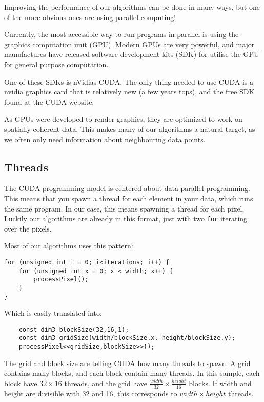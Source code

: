 
Improving the performance of our algorithms can be done in many ways,
but one of the more obvious ones are using parallel computing!

Currently, the most accessible way to run programs in parallel is
using the graphics computation unit (GPU). Modern GPUs are very
powerful, and major manufactures have released software development
kits (SDK) for utilise the GPU for general purpose computation.

One of these SDKs is nVidias CUDA. The only thing needed to
use CUDA is a nvidia graphics card that is relatively new (a few years
tops), and the free SDK found at the CUDA website.

As GPUs were developed to render graphics, they are optimized to work
on spatially coherent data. This makes many of our algorithms a
natural target, as we often only need information about neighbouring
data points.

\subsection{Threads}

The CUDA programming model is centered about data parallel
programming. This means that you spawn a thread for each element in
your data, which runs the same program. In our case, this means
spawning a thread for each pixel. Luckily our algorithms are already
in this format, just with two \texttt{for} iterating over the pixels.

Most of our algorithms uses this pattern:

\begin{lstlisting}
for (unsigned int i = 0; i<iterations; i++) {
    for (unsigned int x = 0; x < width; x++) {
        processPixel();
    }
}
\end{lstlisting}

Which is easily translated into:
\begin{lstlisting}
    const dim3 blockSize(32,16,1);
    const dim3 gridSize(width/blockSize.x, height/blockSize.y);
    processPixel<<gridSize,blockSize>>();
\end{lstlisting}

The grid and block size are telling CUDA how many threads to
spawn. A grid contains many blocks, and each block contain many
threads. In this sample, each block have $32 \times 16$ threads, and
the grid have $\frac{width}{32} \times \frac{height}{16}$ blocks. If
width and height are divisible with 32 and 16, this corresponds to
$width \times height$ threads. 

